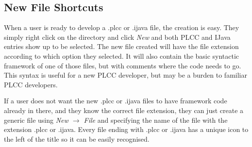 \documentclass[conference, letterpaper]{IEEEtran}
\begin{document}
\subsection{New File Shortcuts}\label{subsec:new-plcc-file-shortcut}
When a user is ready to develop a .plcc or .ijava file, the creation is easy.
They simply right click on the directory and click \textit{New} and both PLCC and IJava entries show up to be selected.
The new file created will have the file extension according to which option they selected.
It will also contain the basic syntactic framework of one of those files, but with comments where the code needs to go.
This syntax is useful for a new PLCC developer, but may be a burden to familiar PLCC developers.

If a user does not want the new .plcc or .ijava files to have framework code already in there, and they know the correct file extension, they can just create a generic file using \textit{New $\rightarrow$ File} and specifying the name of the file with the extension .plcc or .ijava.
Every file ending with .plcc or .ijava has a unique icon to the left of the title so it can be easily recognised.
\end{document}
